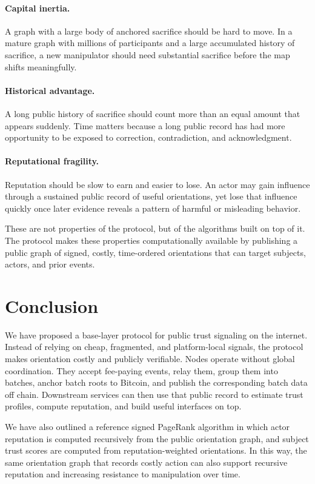 \documentclass[11pt]{article}
\begin{document}
\paragraph{Capital inertia.}
A graph with a large body of anchored sacrifice should be hard to move. In a mature graph with millions of participants and a large accumulated history of sacrifice, a new manipulator should need substantial sacrifice before the map shifts meaningfully.

\paragraph{Historical advantage.}
A long public history of sacrifice should count more than an equal amount that appears suddenly. Time matters because a long public record has had more opportunity to be exposed to correction, contradiction, and acknowledgment.

\paragraph{Reputational fragility.}
Reputation should be slow to earn and easier to lose. An actor may gain influence through a sustained public record of useful orientations, yet lose that influence quickly once later evidence reveals a pattern of harmful or misleading behavior.

These are not properties of the protocol, but of the algorithms built on top of it. The protocol makes these properties computationally available by publishing a public graph of signed, costly, time-ordered orientations that can target subjects, actors, and prior events.

\section{Conclusion}

We have proposed a base-layer protocol for public trust signaling on the internet. Instead of relying on cheap, fragmented, and platform-local signals, the protocol makes orientation costly and publicly verifiable. Nodes operate without global coordination. They accept fee-paying events, relay them, group them into batches, anchor batch roots to Bitcoin, and publish the corresponding batch data off chain. Downstream services can then use that public record to estimate trust profiles, compute reputation, and build useful interfaces on top.

We have also outlined a reference signed PageRank algorithm in which actor reputation is computed recursively from the public orientation graph, and subject trust scores are computed from reputation-weighted orientations. In this way, the same orientation graph that records costly action can also support recursive reputation and increasing resistance to manipulation over time.
\end{document}
